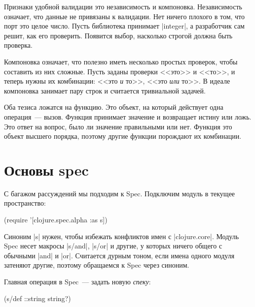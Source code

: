 
Признаки удобной валидации это независимость и компоновка. Независимость
означает, что данные не привязаны к валидации. Нет ничего плохого в том, что
порт это целое число. Пусть библиотека принимает \spverb|integer|, а разработчик
сам решит, как его проверить. Появится выбор, насколько строгой должна быть
проверка.


Компоновка означает, что полезно иметь несколько простых проверок, чтобы
составить из них сложные. Пусть заданы проверки <<это>> и <<то>>, и теперь нужны
их комбинации: <<это \emph{и} то>>, <<это \emph{или} то>>. В идеале компоновка
занимает пару строк и считается тривиальной задачей.


Оба тезиса ложатся на функцию. Это объект, на который действует одна
операция~--- вызов. Функция принимает значение и возвращает истину или ложь. Это
ответ на вопрос, было ли значение правильными или нет. Функция это объект
высшего порядка, поэтому другие функции порождают их комбинации.

\section{Основы spec}

С багажом рассуждений мы подходим к Spec. Подключим модуль в текущее
пространство:

\begin{english}
  \begin{clojure}
(require '[clojure.spec.alpha :as s])
  \end{clojure}
\end{english}

Синоним \spverb|s| нужен, чтобы избежать конфликтов имен с
\spverb|clojure.core|. Модуль Spec несет макросы \spverb|s/and|, \spverb|s/or| и
другие, у которых ничего общего с обычными \spverb|and| и \spverb|or|. Считается
дурным тоном, если имена одного модуля затеняют другие, поэтому обращаемся к
Spec через синоним.


Главная операция в Spec~--- задать новую \emph{спеку}:

\begin{english}
  \begin{clojure}
(s/def ::string string?)
  \end{clojure}
\end{english}

